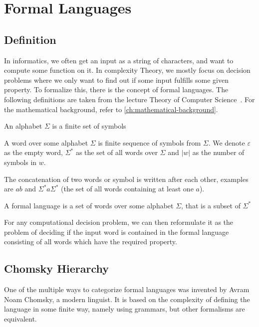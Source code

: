 \chapter{Formal Languages}\label{ch:formal-languages}


\section{Definition}\label{sec:definition}

In informatics, we often get an input as a string of characters, and want to compute some function on it.
In complexity Theory, we mostly focus on decision problems where we only want to find out if some input fulfills some given property.
To formalize this, there is the concept of formal languages.
The following definitions are taken from the lecture Theory of Computer Science~\cite{theory-cs}.
For the mathematical background, refer to \autoref{ch:mathematical-background}.

\begin{define}[Alphabet]
    An alphabet $\Sigma$ is a finite set of symbols
\end{define}

\begin{define}[Word]
    A word over some alphabet $\Sigma$ is finite sequence of symbols from $\Sigma$.
    We denote $\varepsilon$ as the empty word, $\Sigma^*$ as the set of all words over $\Sigma$ and $|w|$ as the number of symbols in $w$.
\end{define}

The concatenation of two words or symbol is written after each other, examples are $ab$ and $\Sigma^*a\Sigma^*$ (the set of all words containing at least one $a$).

\begin{define}
    A formal language is a set of words over some alphabet $\Sigma$, that is a subset of $\Sigma^*$
\end{define}

For any computational decision problem, we can then reformulate it as the problem of deciding if the input word is contained in the formal language consisting of all words which have the required property.


\section{Chomsky Hierarchy}\label{sec:chromsky-hierarchy}

One of the multiple ways to categorize formal languages was invented by Avram Noam Chomsky, a modern linguist.
It is based on the complexity of defining the language in some finite way, namely using grammars, but other formalisms are equivalent.

